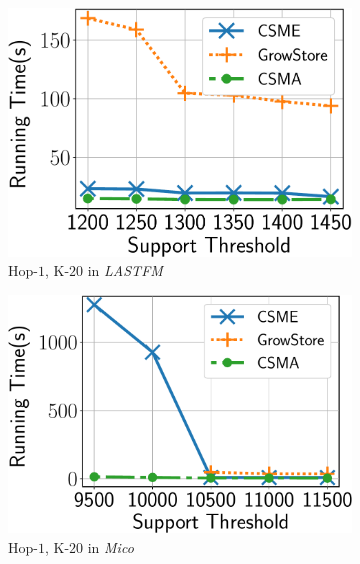 \begin{figure}
	\vspace{-2mm}
	\centering
	\begin{subfigure}[b]{0.25\textwidth}
		\includegraphics[scale=0.24]{img2/lastfm/lastfm_h1.pdf}
		\caption{\scriptsize {\sf Hop-$1$, K-$20$} in {\em LASTFM}}
		\label{fig:lastfm_h1}
	\end{subfigure}%
	\begin{subfigure}[b]{0.25\textwidth}
		\includegraphics[scale=0.24]{img2/mico/mico_h1.pdf}
		\caption{\scriptsize {\sf Hop-$1$, K-$20$} in {\em Mico}}
		\label{fig:mico_h1}
	\end{subfigure}%
	\begin{subfigure}[b]{0.25\textwidth}

\end{subfigure}
\end{figure}
